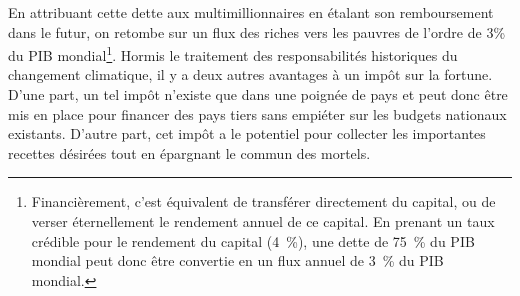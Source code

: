 \documentclass[a5paper,french]{memoir}
\begin{document}
En attribuant cette dette aux multimillionnaires en étalant son remboursement dans le futur, on retombe sur un flux des riches vers les pauvres de l'ordre de 3\% du PIB mondial\footnote{Financièrement, c'est équivalent de transférer directement du capital, ou de verser éternellement le rendement annuel de ce capital. En prenant un taux crédible pour le rendement du capital (4~\%), une dette de 75~\% du PIB mondial peut donc être convertie en un flux annuel de 3~\% du PIB mondial.
}. 
Hormis le traitement des responsabilités historiques du changement climatique, il y a deux autres avantages à un impôt sur la fortune. D'une part, un tel impôt n'existe que dans une poignée de pays et peut donc être mis en place pour financer des pays tiers sans empiéter sur les budgets nationaux existants. D'autre part, cet impôt a le potentiel pour collecter %
les importantes recettes désirées tout en épargnant le commun des mortels. %
\end{document}
